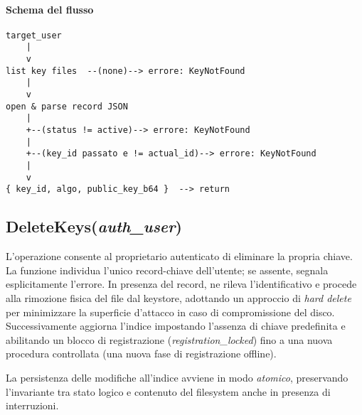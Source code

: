 \paragraph{Schema del flusso}
\begin{verbatim}
target_user
    |
    v
list key files  --(none)--> errore: KeyNotFound
    |
    v
open & parse record JSON
    |
    +--(status != active)--> errore: KeyNotFound
    |
    +--(key_id passato e != actual_id)--> errore: KeyNotFound
    |
    v
{ key_id, algo, public_key_b64 }  --> return
\end{verbatim}

\clearpage
\subsection{DeleteKeys(\textit{auth\_user})}
L'operazione consente al proprietario autenticato di eliminare la propria chiave. La funzione individua l'unico record-chiave dell'utente; se assente, segnala esplicitamente l'errore. In presenza del record, ne rileva l'identificativo e procede alla rimozione fisica del file dal keystore, adottando un approccio di \emph{hard delete} per minimizzare la superficie d'attacco in caso di compromissione del disco. Successivamente aggiorna l'indice impostando l'assenza di chiave predefinita e abilitando un blocco di registrazione (\textit{registration\_locked}) fino a una nuova procedura controllata (una nuova fase di registrazione offline).

La persistenza delle modifiche all'indice avviene in modo \emph{atomico}, preservando l'invariante tra stato logico e contenuto del filesystem anche in presenza di interruzioni.

